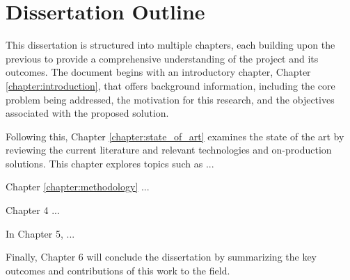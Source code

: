 \section{Dissertation Outline} \label{section:dissertation_outline}

This dissertation is structured into multiple chapters, each building upon the previous to provide a comprehensive understanding of the project and its outcomes. The document begins with an introductory chapter, Chapter \ref{chapter:introduction}, that offers background information, including the core problem being addressed, the motivation for this research, and the objectives associated with the proposed solution.

Following this, Chapter \ref{chapter:state_of_art} examines the state of the art by reviewing the current literature and relevant technologies and on-production solutions. This chapter explores topics such as ... %

Chapter \ref{chapter:methodology} ... %

Chapter 4 ... %

In Chapter 5, ... %

Finally, Chapter 6 will conclude the dissertation by summarizing the key outcomes and contributions of this work to the field. %
